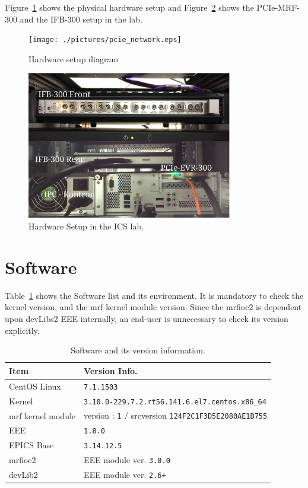 \documentclass[11pt
  , a4paper
  , article
  , oneside
  , showtrims
]{memoir}
\begin{document}
Figure~\ref{fig:diagram} shows the physical hardware setup and Figure~\ref{fig:hw-setup} shows the PCIe-MRF-300 and the IFB-300 setup in the lab. 
\begin{figure}[!t]
  \centering
    \texttt{[image: ./pictures/pcie\_network.eps]}
  \caption{Hardware setup diagram}
  \label{fig:diagram}
\end{figure}
\begin{figure}[!b]
  \centering
  \includegraphics[width=0.8\textwidth]{./pictures/hw-setup.eps}
  \caption{Hardware Setup in the ICS lab.}
  \label{fig:hw-setup}   
\end{figure}


\clearpage
\section{Software}
Table~\ref{table:swlist} shows the Software list and its environment. It is mandatory to check the kernel version, and the mrf kernel module version. Since the mrfioc2 is dependent upon devLibs2 EEE internally, an end-user is unnecessary to check its version explicitly. 
\begin{table}[!htb]
  \centering
  \begin{tabular}{l|l}
    \toprule
    Item               & Version Info.                                            \\\midrule
    CentOS Linux       & \texttt{7.1.1503}                                        \\\midrule
    Kernel             & \texttt{3.10.0-229.7.2.rt56.141.6.el7.centos.x86\_64}    \\\midrule
    mrf kernel module  & version : \texttt{1} / srcversion \texttt{124F2C1F3D5E2080AE1B755}     \\\midrule
    EEE                & \texttt{1.8.0}                                  \\\midrule
    EPICS Base         & \texttt{3.14.12.5}                              \\\midrule
    mrfioc2            & EEE module ver. \texttt{3.0.0}                  \\\midrule
    devLib2            & EEE module ver. \texttt{2.6+}                   \\\bottomrule
  \end{tabular}
  \caption[]{Software and its version information.}
  \label{table:swlist}
\end{table}
\end{document}
